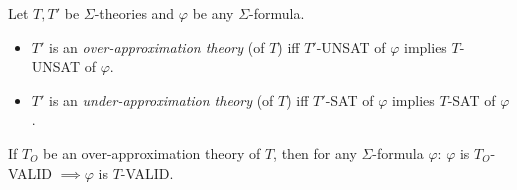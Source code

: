 \begin{comment}
\begin{definition} \label{def:app}
Let $F = \exists x_1 \in I_1 \cdots x_n \in I_n. \psi(x_1,\cdots,x_n)$. 
For a truth assignment on $M$, $F$ is 
\begin{itemize}
\item $T$-valid if $M \models_T \psi(x_1,\cdots,$ $x_n)$, 
\item $T$-satisfiable ($T$-SAT) if $m \models_T \psi(x_1,\cdots,x_n)$ 
for some $m \in M$, and 
\item $T$-unsatisfiable ($T$-UNSAT) if $M \models_T \neg \psi(x_1,\cdots,x_n)$. 
\end{itemize}
If $T$ is clear from the context, we simply say valid, satisfiable, and unsatisfiable. 
\end{definition}
\end{comment}


\begin{definition} \label{def:ApproxTheory}
Let $T, T'$ be $\Sigma$-theories and $\varphi$ be any $\Sigma$-formula. 
\begin{itemize}
\item $T'$ is an {\em over-approximation theory} (of $T$) 
iff $T'$-UNSAT of $\varphi$ implies $T$-UNSAT of $\varphi$.
\item $T'$ is an {\em under-approximation theory} (of $T$)
iff $T'$-SAT of $\varphi$ implies $T$-SAT of $\varphi$. 
\end{itemize}
\end{definition}

\begin{theorem}
If $T_O$ be an over-approximation theory of $T$, then for any $\Sigma$-formula $\varphi$: $\varphi$ is $T_O$-VALID $\implies \varphi$ is $T$-VALID.
\end{theorem}

